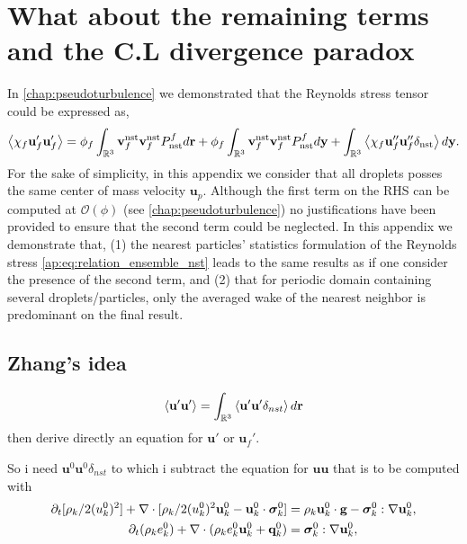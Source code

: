 \section{What about the remaining terms and the C.L divergence paradox }

In \ref{chap:pseudoturbulence} we demonstrated that the Reynolds stress tensor could be expressed as,
\begin{equation}
    \avg{\chi_f \textbf{u}_f'\textbf{u}_f'}
    = 
    \phi_f
    \int_{\mathbb{R}^3}
    \textbf{v}_f^\text{nst}
    \textbf{v}_f^\text{nst}
    P_\text{nst}^f
    d\textbf{r}
    + 
    \phi_f
    \int_{\mathbb{R}^3}
    \textbf{v}_f^\text{nst}
    \textbf{v}_f^\text{nst}
    P_\text{nst}^f
    d\textbf{y}
    + 
    \int_{\mathbb{R}^3}
    \avg{
        \chi_f
        \textbf{u}_f''
        \textbf{u}_f''
        \delta_\text{nst}
    }
    d\textbf{y}.
    \label{ap:eq:relation_ensemble_nst}
\end{equation}
For the sake of simplicity, in this appendix we consider that all droplets posses the same center of mass velocity $\textbf{u}_p$. 
Although the first term on the RHS can be computed at $\mathcal{O}(\phi)$ (see \ref{chap:pseudoturbulence}) no justifications have been provided to ensure that the second term could be neglected. 
In this appendix we demonstrate that, (1) the nearest particles' statistics formulation of the Reynolds stress \eqref{ap:eq:relation_ensemble_nst} leads to the same results as \citet{caflisch1985variance} if one consider the presence of the second term, and (2) that for periodic domain containing several droplets/particles, only the averaged wake of the nearest neighbor is predominant on the final result. 


\subsection{Zhang's idea}

\begin{equation}
    \left<\textbf{u}'\textbf{u}'\right>
    =
    \int_{\mathbb{R}^3}\left<\textbf{u}'\textbf{u}'\delta_{nst}\right> d\textbf{r}
\end{equation}
then derive directly an equation for $\textbf{u}'$ or $\textbf{u}_f'$. 

So i need $\textbf{u}^0\textbf{u}^0\delta_{nst}$ to which i subtract the equation for $\textbf{u} \textbf{u}$
that is to be computed with 
\begin{align}
    \label{eq:dt_rhou_k2}
    \pddt [\rho_k/2(u_k^0)^2]  
    + \div [\rho_k/2(u_k^0)^2\textbf{u}_k^0 - \textbf{u}_k^0 \cdot \bm{\sigma}_k^0]
    &=
    \rho_k\textbf{u}_k^0 \cdot \textbf{g}  
    -  \bm{\sigma}_k^0 : \grad \textbf{u}_k^0,
    \\
    \label{eq:dt_rhoe_k}
    \pddt (\rho_ke_k^0)  
    + \div (
        \rho_ke_k^0\textbf{u}_k^0
        + \textbf{q}_k^0
        )
    &= 
    \bm{\sigma}_k^0 : \grad \textbf{u}_k^0,
\end{align} 

